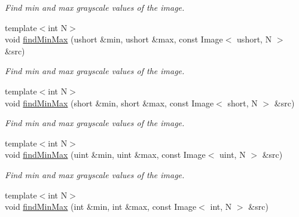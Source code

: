 \begin{DoxyCompactItemize}
\begin{DoxyCompactList}\small\item\em Find min and max grayscale values of the image. \end{DoxyCompactList}\item 
\hypertarget{group___image_ga2e0de156bfbfe1e71de0fa87c3c4dd3b}{{\footnotesize template$<$int N$>$ }\\void \hyperlink{group___image_ga2e0de156bfbfe1e71de0fa87c3c4dd3b}{find\-Min\-Max} (ushort \&min, ushort \&max, const Image$<$ ushort, N $>$ \&src)}\label{group___image_ga2e0de156bfbfe1e71de0fa87c3c4dd3b}

\begin{DoxyCompactList}\small\item\em Find min and max grayscale values of the image. \end{DoxyCompactList}\item 
\hypertarget{group___image_ga12e66e7dfc90903cf9cda77e1ee9caa1}{{\footnotesize template$<$int N$>$ }\\void \hyperlink{group___image_ga12e66e7dfc90903cf9cda77e1ee9caa1}{find\-Min\-Max} (short \&min, short \&max, const Image$<$ short, N $>$ \&src)}\label{group___image_ga12e66e7dfc90903cf9cda77e1ee9caa1}

\begin{DoxyCompactList}\small\item\em Find min and max grayscale values of the image. \end{DoxyCompactList}\item 
\hypertarget{group___image_ga5fdba220239c83db39192d5663c9590d}{{\footnotesize template$<$int N$>$ }\\void \hyperlink{group___image_ga5fdba220239c83db39192d5663c9590d}{find\-Min\-Max} (uint \&min, uint \&max, const Image$<$ uint, N $>$ \&src)}\label{group___image_ga5fdba220239c83db39192d5663c9590d}

\begin{DoxyCompactList}\small\item\em Find min and max grayscale values of the image. \end{DoxyCompactList}\item 
\hypertarget{group___image_gae75301dfe4245689d6552204da1bac7c}{{\footnotesize template$<$int N$>$ }\\void \hyperlink{group___image_gae75301dfe4245689d6552204da1bac7c}{find\-Min\-Max} (int \&min, int \&max, const Image$<$ int, N $>$ \&src)}\label{group___image_gae75301dfe4245689d6552204da1bac7c}


\end{DoxyCompactItemize}
